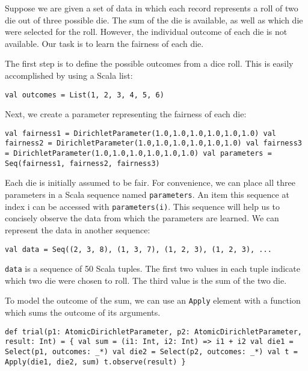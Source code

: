 Suppose we are given a set of data in which each record represents a roll of two die out of three possible die. The sum of the die is available, as well as which die were selected for the roll. However, the individual outcome of each die is not available. Our task is to learn the fairness of each die.

The first step is to define the possible outcomes from a dice roll. This is easily accomplished by using a Scala list:

\begin{flushleft}
\texttt{val outcomes = List(1, 2, 3, 4, 5, 6)}
\end{flushleft}

Next, we create a parameter representing the fairness of each die:

\begin{flushleft}
\texttt{val fairness1 = DirichletParameter(1.0,1.0,1.0,1.0,1.0,1.0) 
\newline val fairness2 = DirichletParameter(1.0,1.0,1.0,1.0,1.0,1.0) 
\newline val fairness3 = DirichletParameter(1.0,1.0,1.0,1.0,1.0,1.0) 
\newline val parameters = Seq(fairness1, fairness2, fairness3)
}
\end{flushleft}

Each die is initially assumed to be fair. For convenience, we can place all three parameters in a Scala sequence named \texttt{parameters}.  An item this sequence at index i can be accessed with \texttt{parameters(i)}. This sequence will help us to concisely observe the data from which the parameters are learned. We can represent the data in another sequence:

\begin{flushleft}
\texttt{val data = Seq((2, 3, 8), (1, 3, 7), (1, 2, 3), (1, 2, 3), ...}
\end{flushleft}

\texttt{data} is a sequence of 50 Scala tuples. The first two values in each tuple indicate which two die were chosen to roll. The third value is the sum of the two die.

To model the outcome of the sum, we can use an \texttt{Apply} element with a function which sums the outcome of its arguments.

\begin{flushleft}
\texttt{def trial(p1: AtomicDirichletParameter, p2: AtomicDirichletParameter, result: Int) = \{
\newline \tab val sum = (i1: Int, i2: Int) => i1 + i2 
\newline \tab val die1 = Select(p1, outcomes: \_*)
\newline \tab val die2 = Select(p2, outcomes: \_*)
\newline \tab val t = Apply(die1, die2, sum)
\newline \tab t.observe(result)
\newline \}
}
\end{flushleft}

